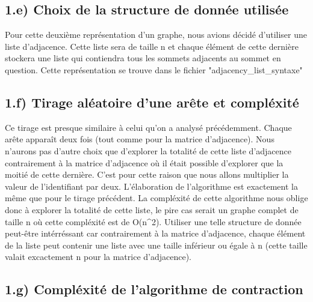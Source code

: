 \newline \newline

\subsection{1.e) Choix de la structure de donnée utilisée}

Pour cette deuxième représentation d'un graphe, nous avions décidé d'utiliser une liste d'adjacence. Cette liste sera de taille n et chaque élément de cette dernière stockera une liste qui contiendra tous les sommets adjacents au sommet en question.\newline \newline
Cette représentation se trouve dans le fichier "adjacency\_list\_syntaxe"

\newline \newline 


\subsection{1.f) Tirage aléatoire d'une arête et compléxité}

Ce tirage est presque similaire à celui qu'on a analysé précédemment. Chaque arête apparaît deux fois (tout comme pour la matrice d'adjacence). Nous n'aurons pas d'autre choix que d'explorer la totalité de cette liste d'adjacence contrairement à la matrice d'adjacence où il était possible d'explorer que la moitié de cette dernière. C'est pour cette raison que nous allons multiplier la valeur de l'identifiant par deux. L'élaboration de l'algorithme est exactement la même que pour le tirage précédent. La compléxité de cette algorithme nous oblige donc à explorer la totalité de cette liste, le pire cas serait un graphe complet de taille n où cette compléxité est de O(n^2).
\newline
Utiliser une telle structure de donnée peut-être intérréssant car contrairement à la matrice d'adjacence, chaque élément de la liste peut contenir une liste avec une taille inférieur ou égale à n (cette taille valait excactement n pour la matrice d'adjacence).

\newline \newline 


\subsection{1.g) Compléxité de l'algorithme de contraction}

